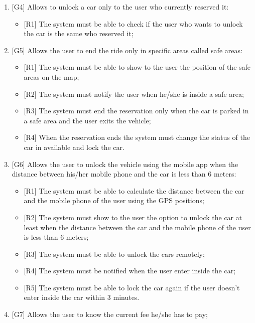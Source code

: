 \begin{enumerate}
\item {[G4]} Allows to unlock a car only to the user who currently reserved it:

\begin{itemize}
	\item {[R1]} The system must be able to check if the user who wants to unlock the car is the same who reserved it;
\end{itemize}

\item {[G5]} Allows the user to end the ride only in specific areas called safe areas:

\begin{itemize}
	\item {[R1]} The system must be able to show to the user the position of the safe areas on the map;
	\item {[R2]} The system must notify the user when he/she is inside a safe area;
	\item {[R3]} The system must end the reservation only when the car is parked in a safe area and the user exits the vehicle;
	\item {[R4]} When the reservation ends the system must change the status of the car in available and lock the car.
\end{itemize}

\item {[G6]} Allows the user to unlock the vehicle using the mobile app when the distance between his/her mobile phone and the car is less than 6 meters:

\begin{itemize}
	\item {[R1]} The system must be able to calculate the distance between the car and the mobile phone of the user using the GPS positions;
	\item {[R2]} The system must show to the user the option to unlock the car at least when the distance between the car and the mobile phone of the user is less than 6 meters;
	\item {[R3]} The system must be able to unlock the cars remotely;
	\item {[R4]} The system must be notified when the user enter inside the car;
	\item {[R5]} The system must be able to lock the car again if the user doesn't enter inside the car within 3 minutes.
\end{itemize}

\item {[G7]} Allows the user to know the current fee he/she has to pay;


\end{enumerate}
